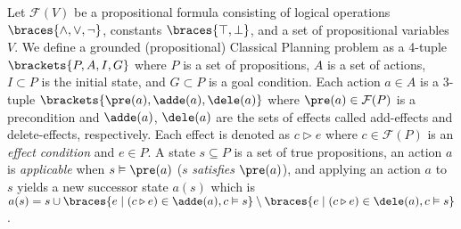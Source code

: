Let $\mathcal{F}(V)$ be a propositional formula consisting of
 logical operations $\braces{\land,\lor,\lnot}$,
 constants $\braces{\top,\bot}$, and
 a set of propositional variables $V$.
We define a grounded (propositional) Classical Planning problem
as a 4-tuple $\brackets{P,A,I,G}$
where
 $P$ is a set of propositions,
 $A$ is a set of actions,
 $I\subset P$ is the initial state, and
 $G\subset P$ is a goal condition.
Each action $a\in A$ is a 3-tuple $\brackets{\pre(a),\adde(a),\dele(a)}$ where
 $\pre(a) \in \mathcal{F}(P)$ is a precondition and
 $\adde(a)$, $\dele(a)$ are the sets of effects called add-effects and delete-effects, respectively.
Each effect is denoted as $c \triangleright e$ where
 $c \in \mathcal{F}(P)$ is an \emph{effect condition} and
 $e \in P$.
A state $s\subseteq P$ is a set of true propositions,
an action $a$ is \emph{applicable} when $s \vDash \pre(a)$ ($s$ \emph{satisfies} $\pre(a)$),
and applying an action $a$ to $s$ yields a new successor state $a(s)$ which is
$a(s) = s \cup \braces{e \mid (c \triangleright e) \in \adde(a), c\vDash s} \setminus \braces{e \mid (c \triangleright e) \in \dele(a), c\vDash s}$.

